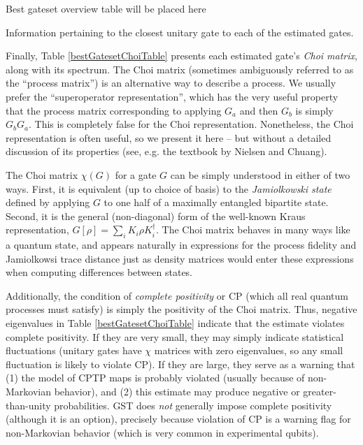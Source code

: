 \documentclass{article}[11pt]
\newcommand{\putfield}[2]{#2}
\begin{document}
\begin{table}[h]
\begin{center}
\putfield{bestGatesetClosestUnitaryTable}{Best gateset overview table will be placed here}
\caption{\putfield{tt_bestGatesetClosestUnitaryTable}{}Information pertaining to the closest unitary gate to each of the estimated gates.\label{bestGatesetClosestUnitaryTable}}
\end{center}
\end{table}


Finally, Table \ref{bestGatesetChoiTable} presents each estimated gate's \emph{Choi matrix}, along with its spectrum.  The Choi matrix (sometimes ambiguously referred to as the ``process matrix'') is an alternative way to describe a process.  We usually prefer the ``superoperator representation'', which has the very useful property that the process matrix corresponding to applying $G_a$ and then $G_b$ is simply $G_bG_a$.  This is completely false for the Choi representation.  Nonetheless, the Choi representation is often useful, so we present it here -- but without a detailed discussion of its properties (see, e.g. the textbook by Nielsen and Chuang).

The Choi matrix $\chi(G)$ for a gate $G$ can be simply understood in either of two ways.  First, it is equivalent (up to choice of basis) to the \emph{Jamiolkowski state} defined by applying $G$ to one half of a maximally entangled bipartite state.  Second, it is the general (non-diagonal) form of the well-known Kraus representation, $G[\rho] = \sum_i{K_i\rho K_i^\dagger}$.  The Choi matrix behaves in many ways like a quantum state, and appears naturally in expressions for the process fidelity and Jamiolkowsi trace distance just as density matrices would enter these expressions when computing differences between states.  

Additionally, the condition of \emph{complete positivity} or CP (which all real quantum processes must satisfy) is simply the positivity of the Choi matrix.  Thus, negative eigenvalues in Table \ref{bestGatesetChoiTable} indicate that the estimate violates complete positivity.  If they are very small, they may simply indicate statistical fluctuations (unitary gates have $\chi$ matrices with zero eigenvalues, so any small fluctuation is likely to violate CP).  If they are large, they serve as a warning that (1) the model of CPTP maps is probably violated (usually because of non-Markovian behavior), and (2) this estimate may produce negative or greater-than-unity probabilities.  GST does \emph{not} generally impose complete positivity (although it is an option), precisely because violation of CP is a warning flag for non-Markovian behavior (which is very common in experimental qubits).
\end{document}
